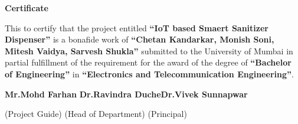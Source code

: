 
\newpage
\thispagestyle{empty}
\begin{center}
\LARGE \textbf { {Certificate} }
\end{center}


\vspace{0.5cm}
This to certify that the project entitled  \textbf{\textquotedblleft IoT based Smaert Sanitizer Dispenser\textquotedblright} is a bonafide work of \textbf{\textquotedblleft Chetan Kandarkar, Monish Soni, Mitesh Vaidya, Sarvesh Shukla\textquotedblright} submitted to the University of Mumbai in partial fulfillment of the requirement for the award of the degree of \textbf{\textquotedblleft Bachelor of Engineering\textquotedblright} in  \textbf{\textquotedblleft Electronics and Telecommunication Engineering\textquotedblright}. 
\vspace{6cm}

\begin{flushleft} \textbf
{Mr.Mohd Farhan} \hspace{10.00mm} \textbf{Dr.Ravindra Duche}\hspace{15.00mm}\textbf{Dr.Vivek Sunnapwar}  \newline



    (Project Guide)  \hspace{18.00mm} (Head of Department) \hspace{22.00mm}
         (Principal)                            
\end{flushleft}









